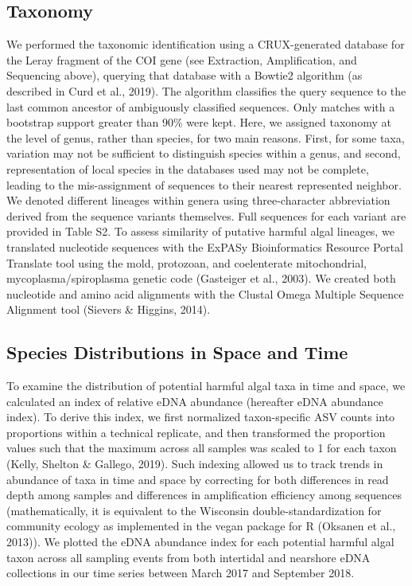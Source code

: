 \documentclass[
]{article}
\begin{document}
\hypertarget{taxonomy}{%
\subsection{Taxonomy}\label{taxonomy}}

We performed the taxonomic identification using a CRUX-generated
database for the Leray fragment of the COI gene (see Extraction,
Amplification, and Sequencing above), querying that database with a
Bowtie2 algorithm (as described in Curd et al., 2019). The algorithm
classifies the query sequence to the last common ancestor of ambiguously
classified sequences. Only matches with a bootstrap support greater than
90\% were kept. Here, we assigned taxonomy at the level of genus, rather
than species, for two main reasons. First, for some taxa, variation may
not be sufficient to distinguish species within a genus, and second,
representation of local species in the databases used may not be
complete, leading to the mis-assignment of sequences to their nearest
represented neighbor. We denoted different lineages within genera using
three-character abbreviation derived from the sequence variants
themselves. Full sequences for each variant are provided in Table S2. To
assess similarity of putative harmful algal lineages, we translated
nucleotide sequences with the ExPASy Bioinformatics Resource Portal
Translate tool using the mold, protozoan, and coelenterate
mitochondrial, mycoplasma/spiroplasma genetic code (Gasteiger et al.,
2003). We created both nucleotide and amino acid alignments with the
Clustal Omega Multiple Sequence Alignment tool (Sievers \& Higgins,
2014).

\hypertarget{species-distributions-in-space-and-time}{%
\subsection{Species Distributions in Space and
Time}\label{species-distributions-in-space-and-time}}

To examine the distribution of potential harmful algal taxa in time and
space, we calculated an index of relative eDNA abundance (hereafter eDNA
abundance index). To derive this index, we first normalized
taxon-specific ASV counts into proportions within a technical replicate,
and then transformed the proportion values such that the maximum across
all samples was scaled to 1 for each taxon (Kelly, Shelton \& Gallego,
2019). Such indexing allowed us to track trends in abundance of taxa in
time and space by correcting for both differences in read depth among
samples and differences in amplification efficiency among sequences
(mathematically, it is equivalent to the Wisconsin
double-standardization for community ecology as implemented in the vegan
package for R (Oksanen et al., 2013)). We plotted the eDNA abundance
index for each potential harmful algal taxon across all sampling events
from both intertidal and nearshore eDNA collections in our time series
between March 2017 and September 2018.
\end{document}
